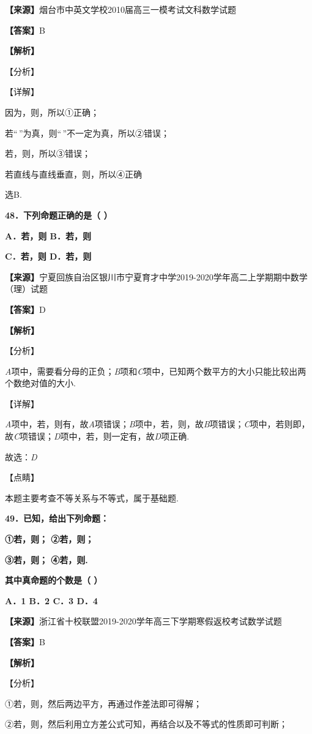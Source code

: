 \documentclass[
]{article}
\begin{document}
\textbf{【来源】}烟台市中英文学校2010届高三一模考试文科数学试题

\textbf{【答案】}B

\textbf{【解析】}

【分析】

【详解】

因为，则，所以①正确；

若``\,''为真，则``\,''不一定为真，所以②错误；

若，则，所以③错误；

若直线与直线垂直，则，所以④正确

选B.

\textbf{48．下列命题正确的是（ ）}

\textbf{A．若，则 B．若，则}

\textbf{C．若，则 D．若，则}

\textbf{【来源】}宁夏回族自治区银川市宁夏育才中学2019-2020学年高二上学期期中数学（理）试题

\textbf{【答案】}D

\textbf{【解析】}

【分析】

\emph{A}项中，需要看分母的正负；\emph{B}项和\emph{C}项中，已知两个数平方的大小只能比较出两个数绝对值的大小.

【详解】

\emph{A}项中，若，则有，故\emph{A}项错误；\emph{B}项中，若，则，故\emph{B}项错误；\emph{C}项中，若则即，故\emph{C}项错误；\emph{D}项中，若，则一定有，故\emph{D}项正确.

故选：\emph{D}

【点睛】

本题主要考查不等关系与不等式，属于基础题.

\textbf{49．已知，给出下列命题：}

\textbf{①若，则； ②若，则；}

\textbf{③若，则； ④若，则.}

\textbf{其中真命题的个数是（ ）}

\textbf{A．1 B．2 C．3 D．4}

\textbf{【来源】}浙江省十校联盟2019-2020学年高三下学期寒假返校考试数学试题

\textbf{【答案】}B

\textbf{【解析】}

【分析】

①若，则，然后两边平方，再通过作差法即可得解；

②若，则，然后利用立方差公式可知，再结合以及不等式的性质即可判断；
\end{document}
